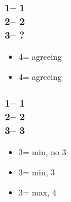 \documentclass[12pt, a4paper]{article}
\begin{document}
\subsubsection*{1\hearts -- 1\spades\\
                2\hearts -- 2\nt\\
                3\spades -- ?}
\begin{itemize}
    \item 4\clubs = agreeing \hearts
    \item 4\diams = agreeing \spades
\end{itemize}

\subsubsection*{1\hearts -- 1\spades\\
                2\hearts -- 2\nt\\
                3\clubs -- 3\diams}
\begin{itemize}
    \item 3\hearts = min, no 3\spades
    \item 3\spades = min, 3\spades
    \item 3\nt = max, 4\clubs
\end{itemize}


\end{document}

